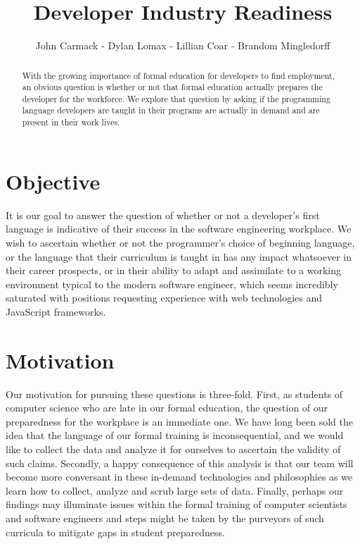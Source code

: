 \documentclass[letterpaper, 10 pt, conference]{ieeeconf}  %
\title{\LARGE \bf
Developer Industry Readiness
}
\author{John Carmack - Dylan Lomax - Lillian Coar - Brandom Mingledorff}%
\begin{document}
\maketitle
\thispagestyle{empty}
\pagestyle{empty}


\begin{abstract}

With the growing importance of formal education for developers to find employment, an
obvious question is whether or not that formal education actually prepares the developer 
for the workforce. We explore that question by asking if the programming language developers 
are taught in their programs are actually in demand and are present in their work lives.

\end{abstract}


\section{Objective}

It is our goal to answer the question of whether or not a developer's first language is indicative of their success in the software engineering workplace. We wish to ascertain whether or not the programmer's choice of beginning language, or the language that their curriculum is taught in has any impact whatsoever in their career prospects, or in their ability to adapt and assimilate to a working environment typical to the modern software engineer, which seems incredibly saturated with positions requesting experience with web technologies and JavaScript frameworks. 

\section{Motivation}

Our motivation for pursuing these questions is three-fold. 
First, as students of computer science who are late in our formal education, the question of our preparedness for the workplace is an immediate one. We have long been sold the idea that the language of our formal training is inconsequential, and we would like to collect the data and analyze it for ourselves to ascertain the validity of such claims. Secondly, a happy consequence of this analysis is that our team will become more conversant in these in-demand technologies and philosophies as we learn how to collect, analyze and scrub large sets of data. Finally, perhaps our findings may illuminate issues within the formal training of computer scientists and software engineers and steps might be taken by the purveyors of such curricula to mitigate gaps in student preparedness. 
\end{document}

